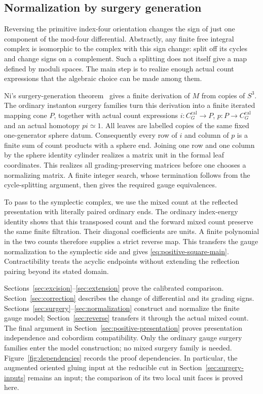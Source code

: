 \documentclass[11pt]{amsart}
\theoremstyle{definition}
\theoremstyle{remark}
\theoremstyle{plain}
\newcommand{\calib}{\mathrm{cal}}
\begin{document}
\subsection{Normalization by surgery generation}
Reversing the primitive index-four orientation changes the sign
of just one component of the mod-four differential. Abstractly,
any finite free integral complex is isomorphic to the complex
with this sign change: split off its cycles and change signs on
a complement. Such a splitting does not itself give a map defined
by moduli spaces. The main step is to realize enough actual count
expressions that the algebraic choice can be made among them.

Ni's surgery-generation theorem~\cite[Theorem~1.4]{Ni}
gives a finite derivation of $M$ from copies of $S^3$. The ordinary
instanton surgery families turn this derivation into a finite
iterated mapping cone $P$, together with actual count expressions
$i:C_G^{\calib}\to P$, $p:P\to C_G^{\calib}$ and an actual
homotopy $pi\simeq1$. All leaves are labelled copies of the same
fixed one-generator sphere datum. Consequently every row of
$i$ and column of $p$ is a finite sum of count products with a
sphere end. Joining one row and one column by the sphere identity
cylinder realizes a matrix unit in the formal leaf coordinates.
This realizes all grading-preserving matrices before one chooses
a normalizing matrix. A finite integer search, whose termination
follows from the cycle-splitting argument, then gives the required
gauge equivalences.

To pass to the symplectic complex, we use the mixed count at the
reflected presentation with literally paired ordinary ends.
The ordinary index-energy identity shows that this transposed
count and the forward mixed count preserve the same finite
filtration. Their diagonal coefficients are units. A finite
polynomial in the two counts therefore supplies a strict reverse
map. This transfers the gauge normalization to the symplectic
side and gives \eqref{eq:positive-square-main}. Contractibility
treats the acyclic endpoints without extending the reflection
pairing beyond its stated domain.

Sections~\ref{sec:excision}--\ref{sec:extension} prove the
calibrated comparison. Section~\ref{sec:correction} describes
the change of differential and its grading signs.
Sections~\ref{sec:surgery}--\ref{sec:normalization} construct
and normalize the finite gauge model; Section~\ref{sec:reverse}
transfers it through the actual mixed count. The final argument
in Section~\ref{sec:positive-presentation} proves presentation
independence and cobordism compatibility. Only the ordinary gauge
surgery families enter the model construction; no mixed surgery
family is needed. Figure~\ref{fig:dependencies} records the proof
dependencies. In particular, the augmented oriented gluing input
at the reducible cut in Section~\ref{sec:surgery-inputs} remains
an input; the comparison of its two local unit faces is proved
here.
\end{document}
